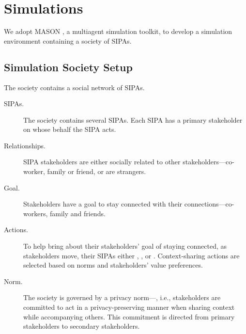 \section{Simulations}
\label{sec:simulations}

We adopt MASON \citep{Luke-2005-Mason}, a multiagent simulation toolkit, to develop a simulation environment containing a society of \locationapp SIPAs. 

\subsection{Simulation Society Setup}
\label{sec:simulation-setup}

The society contains a social network of \locationapp SIPAs. 

\begin{description}

\item[SIPAs.] The society contains several SIPAs. Each SIPA has a primary stakeholder on whose behalf the SIPA acts.  

\item[Relationships.] SIPA stakeholders are either socially related to other stakeholders---co-worker, family or friend, or are strangers. 

\item[Goal.] Stakeholders have a goal to stay connected with their connections---co-workers, family and friends. 


\item[Actions.] To help bring about their stakeholders' goal of staying connected, as stakeholders move, their SIPAs either , , or . Context-sharing actions are selected based on norms and stakeholders' value preferences.

\item[Norm.] The society is governed by a privacy norm---, i.e., stakeholders are committed to act in a privacy-preserving manner when sharing context while accompanying others. This commitment is directed from primary stakeholders to secondary stakeholders.  


\end{description}
